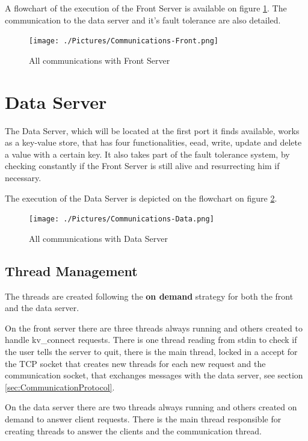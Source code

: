 \documentclass[12pt]{article} %
\begin{document}
A flowchart of the execution of the Front Server is available on figure \ref{fig:CommunicationsFront}.
The communication to the data server and it's fault tolerance are also detailed.

\begin{figure}[ht]
\centering
\texttt{[image: ./Pictures/Communications-Front.png]}
\caption{All communications with Front Server}\label{fig:CommunicationsFront}
\end{figure}

\section{Data Server}
\label{sec:DataServer}

The Data Server, which will be located at the first port it finds available,
works as a key-value store, that has four functionalities, eead,
write, update and delete a value with a certain key. It also takes part of the fault tolerance system,
by checking constantly if the Front Server is still alive and resurrecting him if necessary.

The execution of the Data Server is depicted on the flowchart on figure \ref{fig:CommunicationsData}.

\begin{figure}[ht]
\centering
\texttt{[image: ./Pictures/Communications-Data.png]}
\caption{All communications with Data Server}\label{fig:CommunicationsData}
\end{figure}

\subsection{Thread Management}
\label{sub:ThreadManagement}

The threads are created following the \textbf{on demand} strategy for both the front and
the data server.

On the front server there are three threads always running and others created
to handle kv\_connect requests. There is one thread reading from stdin to check if
the user tells the server to quit, there is the main thread, locked in a accept for the
TCP socket that creates new threads for each new request and the communication
socket, that exchanges messages with the data server, see section \ref{sec:CommunicationProtocol}.

On the data server there are two threads always running and others created
on demand to answer client requests. There is the main thread responsible for
creating threads to answer the clients and the communication thread.
\end{document}
